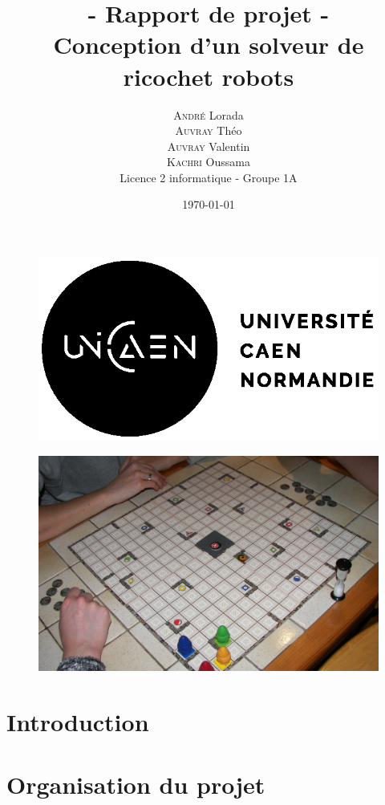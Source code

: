 \documentclass[a4paper, 12pt]{article}
\title{- Rapport de projet - \\ Conception d'un solveur de ricochet robots}
\author{
    \textsc{André} Lorada \\ 
    \textsc{Auvray} Théo \\ 
    \textsc{Auvray} Valentin \\ 
    \textsc{Kachri} Oussama \\ 
Licence 2 informatique - Groupe 1A
}
\date \today
\begin{document}

\begin{figure}[t]
    \includegraphics[scale=1]{images/logo.png}
\end{figure}

\maketitle


\begin{figure}[ht]
            \centering
            \includegraphics[scale=0.5]{images/ricochetrobot.jpg}
\end{figure}

\newpage

\tableofcontents

\newpage

\section{Introduction}
\section{Organisation du projet}
\end{document}
